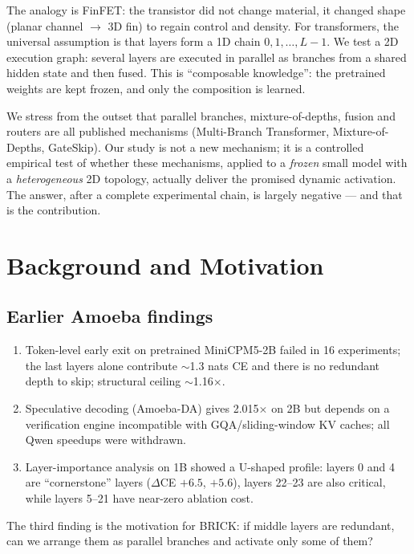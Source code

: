 \documentclass[11pt,a4paper]{article}
\begin{document}
The analogy is FinFET: the transistor did not change material, it changed shape
(planar channel $\to$ 3D fin) to regain control and density. For transformers, the
universal assumption is that layers form a 1D chain $0,1,\ldots,L{-}1$. We test a 2D
execution graph: several layers are executed in parallel as branches from a shared
hidden state and then fused. This is ``composable knowledge'': the pretrained weights
are kept frozen, and only the composition is learned.

We stress from the outset that parallel branches, mixture-of-depths, fusion and
routers are all published mechanisms (Multi-Branch Transformer, Mixture-of-Depths,
GateSkip). Our study is not a new
mechanism; it is a controlled empirical test of whether these mechanisms, applied to
a \emph{frozen} small model with a \emph{heterogeneous} 2D topology, actually deliver
the promised dynamic activation. The answer, after a complete experimental chain,
is largely negative --- and that is the contribution.

\section{Background and Motivation}

\subsection{Earlier Amoeba findings}
\begin{enumerate}[leftmargin=*]
  \item Token-level early exit on pretrained MiniCPM5-2B failed in 16 experiments;
        the last layers alone contribute $\sim$1.3 nats CE and there is no redundant
        depth to skip; structural ceiling $\sim$1.16$\times$.
  \item Speculative decoding (Amoeba-DA) gives 2.015$\times$ on 2B but depends on a
        verification engine incompatible with GQA/sliding-window KV caches; all Qwen
        speedups were withdrawn.
  \item Layer-importance analysis on 1B showed a U-shaped profile: layers 0 and 4 are
        ``cornerstone'' layers ($\Delta$CE $+6.5$, $+5.6$), layers 22--23 are also
        critical, while layers 5--21 have near-zero ablation cost.
\end{enumerate}
The third finding is the motivation for BRICK: if middle layers are redundant, can we
arrange them as parallel branches and activate only some of them?
\end{document}
